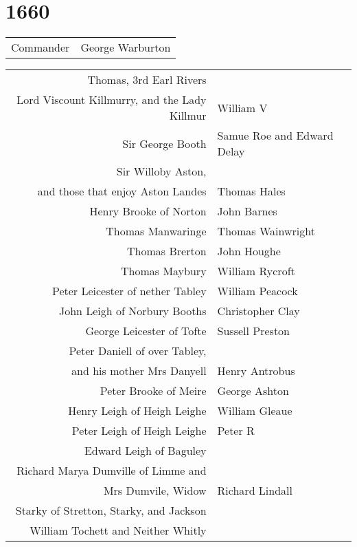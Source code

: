 \chapter*{1660}

\begin{center}
  \begin{tabular}{rl}
    Commander & George Warburton \\
  \end{tabular}
\end{center}

\begin{center}
  \scriptsize
  \begin{tabular}{rl}
    Thomas, 3rd Earl Rivers & \dotfill \\
    Lord Viscount Killmurry, and the Lady Killmur & William V \\
    Sir George Booth & Samue Roe and Edward Delay \\
    Sir Willoby Aston, \\ and those that enjoy Aston Landes & Thomas Hales \\
    Henry Brooke of Norton & John Barnes \\
    Thomas Manwaringe & Thomas Wainwright \\
    Thomas Brerton & John Houghe \\
    Thomas Maybury & William Rycroft \\
    Peter Leicester of nether Tabley & William Peacock \\
    John Leigh of Norbury Booths & Christopher Clay \\
    George Leicester of Tofte & Sussell Preston \\
    Peter Daniell of over Tabley, \\ and his mother Mrs Danyell & Henry Antrobus \\
    Peter Brooke of Meire & George Ashton \\
    Henry Leigh of Heigh Leighe & William Gleaue \\
    Peter Leigh of Heigh Leighe & Peter R \\
    Edward Leigh of Baguley & \dotfill \\
    Richard Marya Dumville of Limme and \\ Mrs Dumvile, Widow & Richard Lindall \\
    Starky of Stretton, Starky, and Jackson & \dotfill \\
    William Tochett and Neither Whitly & \dotfill \\

\end{tabular}
\end{center}
